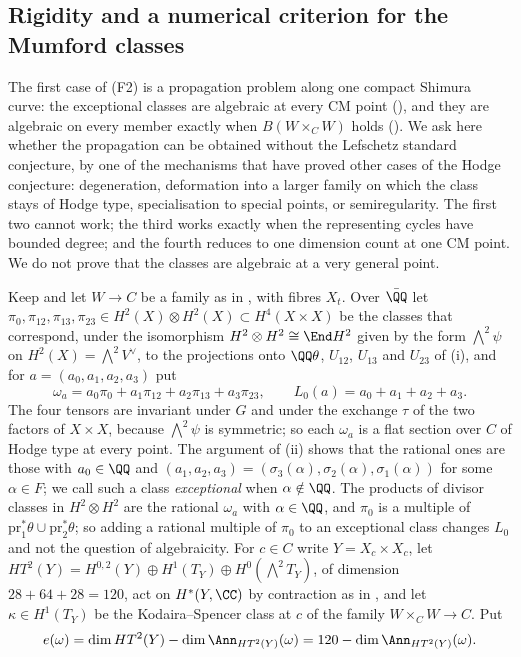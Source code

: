 \subsection{Rigidity and a numerical criterion for the Mumford
classes}\label{ssec:mumfordrigid}

The first case of (F2) is a propagation problem along one compact Shimura
curve: the exceptional classes are algebraic at every CM point
(), and they are algebraic on every member exactly when
$B(W\times_{C}W)$ holds (). We ask here whether the
propagation can be obtained without the Lefschetz standard conjecture, by one
of the mechanisms that have proved other cases of the Hodge conjecture:
degeneration, deformation into a larger family on which the class stays of
Hodge type, specialisation to special points, or semiregularity. The first
two cannot work; the third works exactly when the representing cycles have
bounded degree; and the fourth reduces to one dimension count at one CM
point. We do not prove that the classes are algebraic at a very general
point.

\begin{setupenv}\label{setup:omegaa}
Keep  and let $W\to C$ be a family as in
, with fibres $X_{t}$. Over $\bar{\QQ}$ let
$\pi_{0},\pi_{12},\pi_{13},\pi_{23}\in H^{2}(X)\otimes H^{2}(X)\subset
H^{4}(X\times X)$ be the classes that correspond, under the isomorphism
$H^{2}\otimes H^{2}\cong\End H^{2}$ given by the form ${\textstyle\bigwedge^{2}}\psi$
on $H^{2}(X)={\textstyle\bigwedge^{2}}V^{\vee}$, to the projections onto $\QQ\theta$,
$U_{12}$, $U_{13}$ and $U_{23}$ of (i), and for
$a=(a_{0},a_{1},a_{2},a_{3})$ put
\[
  \omega_{a}=a_{0}\pi_{0}+a_{1}\pi_{12}+a_{2}\pi_{13}+a_{3}\pi_{23},
  \qquad L_{0}(a)=a_{0}+a_{1}+a_{2}+a_{3}.
\]
The four tensors are invariant under $G$ and under the exchange $\tau$ of the
two factors of $X\times X$, because ${\textstyle\bigwedge^{2}}\psi$ is symmetric; so each
$\omega_{a}$ is a flat section over $C$ of Hodge type at every point. The
argument of (ii) shows that the rational ones are those
with $a_{0}\in\QQ$ and $(a_{1},a_{2},a_{3})=(\sigma_{3}(\alpha),
\sigma_{2}(\alpha),\sigma_{1}(\alpha))$ for some $\alpha\in F$; we call such a
class \emph{exceptional} when $\alpha\notin\QQ$. The products of divisor
classes in $H^{2}\otimes H^{2}$ are the rational $\omega_{a}$ with
$\alpha\in\QQ$, and $\pi_{0}$ is a multiple of
$\mathrm{pr}_{1}^{*}\theta\cup\mathrm{pr}_{2}^{*}\theta$; so adding a rational
multiple of $\pi_{0}$ to an exceptional class changes $L_{0}$ and not the
question of algebraicity. For $c\in C$ write $Y=X_{c}\times X_{c}$, let
$HT^{2}(Y)=H^{0,2}(Y)\oplus H^{1}(T_{Y})\oplus H^{0}({\textstyle\bigwedge^{2}}T_{Y})$,
of dimension $28+64+28=120$, act on $H^{*}(Y,\CC)$ by contraction as in
, and let $\kappa\in H^{1}(T_{Y})$ be the Kodaira--Spencer class
at $c$ of the family $W\times_{C}W\to C$. Put
\[
  e(\omega)=\dim HT^{2}(Y)-\dim\Ann_{HT^{2}(Y)}(\omega)
  =120-\dim\Ann_{HT^{2}(Y)}(\omega).
\]
\end{setupenv}

